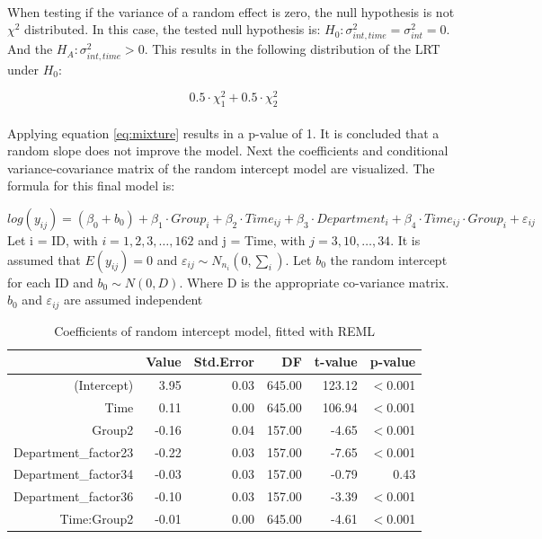 \documentclass{article}
\begin{document}
\paragraph{}
When testing if the variance of a random effect is zero, the null hypothesis is not $\chi^2$ distributed. In this case, the tested null hypothesis is: $H_0: \sigma^2_{int,time} = \sigma^2_{int} = 0$. And the $H_A: \sigma^2_{int,time} > 0$. This results in the following distribution of the LRT under $H_0$:

\begin{equation}\label{eq:mixture}
    0.5 \cdot \chi^2_1 + 0.5 \cdot \chi^2_2
\end{equation}

\paragraph{}
Applying equation \ref{eq:mixture} results in a p-value of 1. It is concluded that a random slope does not improve the model. Next the coefficients and conditional variance-covariance matrix of the random intercept model are visualized. The formula for this final model is:

\begin{equation}
    log(y_{ij}) =  (\beta_0 + b_0) + \beta_1 \cdot Group_i + \beta_2 \cdot Time_{ij} + \beta_3 \cdot Department_{i} + \beta_4 \cdot Time_{ij}\cdot Group_i + \varepsilon_{ij}
\end{equation}
Let i = ID, with $i = 1,2,3,\ldots , 162$ and j = Time, with $j = 3,10,\ldots,34$. It is assumed that $E(y_{ij}) = 0$ and $\varepsilon_{ij} \sim N_{n_i}(0, \sum_i)$. Let $b_0$ the random intercept for each ID and $b_0 \sim N(0, D)$. Where D is the appropriate co-variance matrix. $b_0$ and $\varepsilon_{ij}$ are assumed independent

\begin{table}[ht]
\centering
\caption{Coefficients of random intercept model, fitted with REML}
\begin{tabular}{rrrrrr}
  \hline
 & Value & Std.Error & DF & t-value & p-value \\ 
  \hline
(Intercept) & 3.95 & 0.03 & 645.00 & 123.12 & $<$0.001 \\ 
  Time & 0.11 & 0.00 & 645.00 & 106.94 & $<$0.001 \\ 
  Group2 & -0.16 & 0.04 & 157.00 & -4.65 & $<$0.001 \\ 
  Department\_factor23 & -0.22 & 0.03 & 157.00 & -7.65 & $<$0.001 \\ 
  Department\_factor34 & -0.03 & 0.03 & 157.00 & -0.79 & 0.43 \\ 
  Department\_factor36 & -0.10 & 0.03 & 157.00 & -3.39 & $<$0.001 \\ 
  Time:Group2 & -0.01 & 0.00 & 645.00 & -4.61 & $<$0.001 \\ 
   \hline
\end{tabular}
\label{tab:r1}
\end{table}
\end{document}
